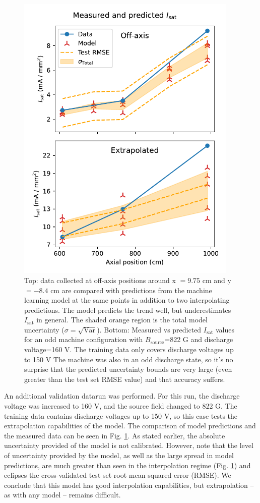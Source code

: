 \begin{figure}
	\centering
	\includegraphics[width=300pt]{figures/measured-vs-predicted_off-axis_160V}
	\caption[Predictions compared with validation dataruns]{\label{fig:measured-vs-predicted}Top: data collected at off-axis positions around x $=9.75$ cm and y $=-8.4$ cm are compared with predictions from the machine learning model at the same points in addition to two interpolating predictions. The model predicts the trend well, but underestimates $I_\text{sat}$ in general. The shaded orange region is the total model uncertainty ($\sigma = \sqrt{\text{Var}}$). Bottom: Measured vs predicted $I_\text{sat}$ values for an odd machine configuration with $B_\text{source}$=822 G and discharge voltage=160 V. The training data only covers discharge voltages up to 150 V The machine was also in an odd discharge state, so it's no surprise that the predicted uncertainty bounds are very large (even greater than the test set RMSE value) and that accuracy suffers.}
\end{figure}

An additional validation datarun was performed. For this run, the discharge voltage was increased to 160 V, and the source field changed to 822 G. The training data contains discharge voltages up to 150 V, so this case tests the extrapolation capabilities of the model. The comparison of model predictions and the measured data can be seen in Fig. \ref{fig:measured-vs-predicted}. As stated earlier, the absolute uncertainty provided of the model is not calibrated. However, note that the level of uncertainty provided by the model, as well as the large spread in model predictions, are much greater than seen in the interpolation regime (Fig. \ref{fig:measured-vs-predicted}) and eclipses the cross-validated test set root mean squared error (RMSE). We conclude that this model has good interpolation capabilities, but extrapolation -- as with any model -- remains difficult.

